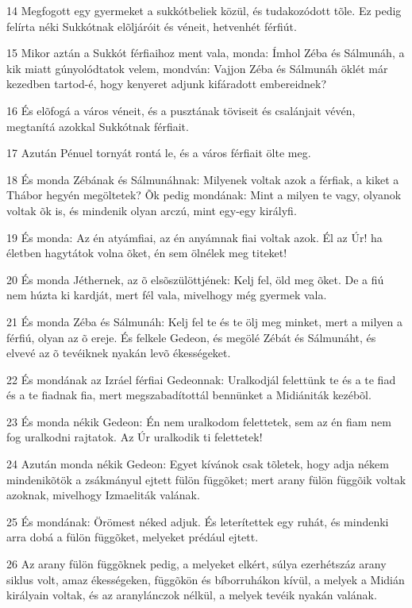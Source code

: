 \par 14 Megfogott egy gyermeket a sukkótbeliek közül, és tudakozódott tõle. Ez pedig felírta néki Sukkótnak elõljáróit és véneit, hetvenhét férfiút.
\par 15 Mikor aztán a Sukkót férfiaihoz ment vala, monda: Ímhol Zéba és Sálmunáh, a kik miatt gúnyolódtatok velem, mondván: Vajjon Zéba és Sálmunáh öklét már kezedben tartod-é, hogy kenyeret adjunk kifáradott embereidnek?
\par 16 És elõfogá a város véneit, és a pusztának töviseit és csalánjait vévén, megtanítá azokkal Sukkótnak férfiait.
\par 17 Azután Pénuel tornyát rontá le, és a város férfiait ölte meg.
\par 18 És monda Zébának és Sálmunáhnak: Milyenek voltak azok a férfiak, a kiket a Thábor hegyén megöltetek? Õk pedig mondának: Mint a milyen te vagy, olyanok voltak õk is, és mindenik olyan arczú, mint egy-egy királyfi.
\par 19 És monda: Az én atyámfiai, az én anyámnak fiai voltak azok. Él az Úr! ha életben hagytátok volna õket, én sem ölnélek meg titeket!
\par 20 És monda Jéthernek, az õ elsõszülöttjének: Kelj fel, öld meg õket. De a fiú nem húzta ki kardját, mert fél vala, mivelhogy még gyermek vala.
\par 21 És monda Zéba és Sálmunáh: Kelj fel te és te ölj meg minket, mert a milyen a férfiú, olyan az õ ereje. És felkele Gedeon, és megölé Zébát és Sálmunáht, és elvevé az õ tevéiknek nyakán levõ ékességeket.
\par 22 És mondának az Izráel férfiai Gedeonnak: Uralkodjál felettünk te és a te fiad és a te fiadnak fia, mert megszabadítottál bennünket a Midiániták kezébõl.
\par 23 És monda nékik Gedeon: Én nem uralkodom felettetek, sem az én fiam nem fog uralkodni rajtatok. Az Úr uralkodik ti felettetek!
\par 24 Azután monda nékik Gedeon: Egyet kívánok csak tõletek, hogy adja nékem mindenikõtök a zsákmányul ejtett fülön függõket; mert arany fülön függõik voltak azoknak, mivelhogy Izmaeliták valának.
\par 25 És mondának: Örömest néked adjuk. És leterítettek egy ruhát, és mindenki arra dobá a fülön függõket, melyeket prédául ejtett.
\par 26 Az arany fülön függõknek pedig, a melyeket elkért, súlya ezerhétszáz arany siklus volt, amaz ékességeken, függõkön és bíborruhákon kívül, a melyek a Midián királyain voltak, és az aranylánczok nélkül, a melyek tevéik nyakán valának.
